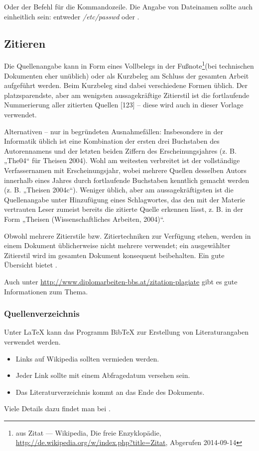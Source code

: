 Oder der Befehl  für die Kommandozeile. Die Angabe von
Dateinamen sollte auch einheitlich sein: entweder \emph{/etc/passwd}
oder .


\subsection{Zitieren}

Die Quellenangabe kann in Form eines Vollbelegs in der Fußnote\footnote{aus Zitat --- Wikipedia, Die freie Enzyklopädie, \url{http://de.wikipedia.org/w/index.php?title=Zitat},
Abgerufen 2014-09-14}(bei technischen Dokumenten eher unüblich) oder als Kurzbeleg am Schluss
der gesamten Arbeit aufgeführt werden. Beim Kurzbeleg sind dabei verschiedene
Formen üblich. Der platzsparendste, aber am wenigsten aussagekräftige
Zitierstil ist die fortlaufende Nummerierung aller zitierten Quellen
{[}123{]} -- diese wird auch in dieser Vorlage verwendet.

Alternativen -- nur in begründeten Ausnahmefällen: Insbesondere in
der Informatik üblich ist eine Kombination der ersten drei Buchstaben
des Autorennamens und der letzten beiden Ziffern des Erscheinungsjahres
(z. B. „The04“ für Theisen 2004). Wohl am weitesten verbreitet ist
der vollständige Verfassernamen mit Erscheinungsjahr, wobei mehrere
Quellen desselben Autors innerhalb eines Jahres durch fortlaufende
Buchstaben kenntlich gemacht werden (z. B. „Theisen 2004c“). Weniger
üblich, aber am aussagekräftigsten ist die Quellenangabe unter Hinzufügung
eines Schlagwortes, das den mit der Materie vertrauten Leser zumeist
bereits die zitierte Quelle erkennen lässt, z. B. in der Form „Theisen
(Wissenschaftliches Arbeiten, 2004)“.

Obwohl mehrere Zitierstile bzw. Zitiertechniken zur Verfügung stehen,
werden in einem Dokument üblicherweise nicht mehrere verwendet; ein
ausgewählter Zitierstil wird im gesamten Dokument konsequent beibehalten.
Ein gute Übersicht bietet \citep{wiki:zitat}.

Auch unter \url{http://www.diplomarbeiten-bbs.at/zitation-plagiate}
gibt es gute Informationen zum Thema.


\subsubsection{Quellenverzeichnis}

Unter \LaTeX{} kann das Programm Bib\TeX{} zur Erstellung von Literaturangaben
verwendet werden. 
\begin{itemize}
\item Links auf Wikipedia sollten vermieden werden.
\item Jeder Link sollte mit einem Abfragedatum versehen sein.
\item Das Literaturverzeichnis kommt an das Ende des Dokuments.
\end{itemize}
Viele Details dazu findet man bei \citep{wiki:zitat}.


